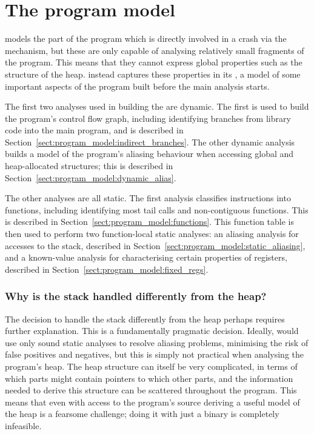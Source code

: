\chapter{The program model}

{\Technique} models the part of the program which is directly involved
in a crash via the {\StateMachine} mechanism, but these are only
capable of analysing relatively small fragments of the program.  This
means that they cannot express global properties such as the structure
of the heap.  {\Technique} instead captures these properties in its
, a model of some important aspects of the
program built before the main analysis starts.

The first two analyses used in building the 
are dynamic.  The first is used to build the program's control flow
graph, including identifying branches from library code into the main
program, and is described in
Section~\ref{sect:program_model:indirect_branches}.  The other dynamic
analysis builds a model of the program's aliasing behaviour when
accessing global and heap-allocated structures; this is described in
Section~\ref{sect:program_model:dynamic_alias}.

The other analyses are all static.  The first analysis classifies
instructions into functions, including identifying most tail calls and
non-contiguous functions. This is described in
Section~\ref{sect:program_model:functions}.  This function table is
then used to perform two function-local static analyses: an aliasing
analysis for accesses to the stack, described in
Section~\ref{sect:program_model:static_aliasing}, and a known-value
analysis for characterising certain properties of registers, described
in Section~\ref{sect:program_model:fixed_regs}.

\subsection{Why is the stack handled differently from the heap?}

The decision to handle the stack differently from the heap perhaps
requires further explanation.  This is a fundamentally pragmatic
decision.  Ideally, {\technique} would use only sound static analyses
to resolve aliasing problems, minimising the risk of false positives
and negatives, but this is simply not practical when analysing the
program's heap.  The heap structure can itself be very complicated, in
terms of which parts might contain pointers to which other parts, and
the information needed to derive this structure can be scattered
throughout the program.  This means that even with access to the
program's source deriving a useful model of the heap is a fearsome
challenge\needCite{}; doing it with just a binary is completely
infeasible.

